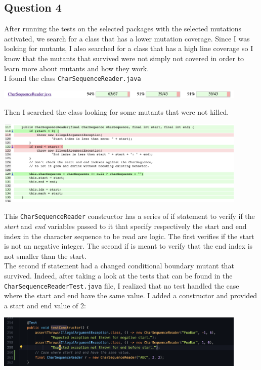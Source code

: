 \subsection*{Question 4}

\noindent After running the tests on the selected packages with the selected mutations activated, we search for a class that has a lower mutation coverage. Since I was looking for mutants, I also searched for a class that has a high line coverage so I know that the mutants that survived were not simply not covered in order to learn more about mutants and how they work.\\ I found the class \verb|CharSequenceReader.java|

\begin{center}
        \includegraphics[width=0.9\textwidth]{img/partD-before2.png}
\end{center}

\noindent Then I searched the class looking for some mutants that were not killed. 

\begin{center}
        \includegraphics[width=0.9\textwidth]{img/partD-before3.png}
\end{center}

\noindent This \verb|CharSequenceReader| constructor has a series of if statement to verify if the \textit{start} and \textit{end} variables passed to it that specify respectively the start and end index in the character sequence to be read are logic. The first verifies if the start is not an negative integer. The second if is meant to verify that the end index is not smaller than the start. \\ The second if statement had a changed conditional boundary mutant that survived. Indeed, after taking a look at the tests that can be found in the \verb|CharSequenceReaderTest.java| file, I realized that no test handled the case where the start and end have the same value. I added a constructor and provided a start and end value of 2:
\begin{center}
        \includegraphics[width=0.9\textwidth]{img/partD-after.png}
\end{center}

